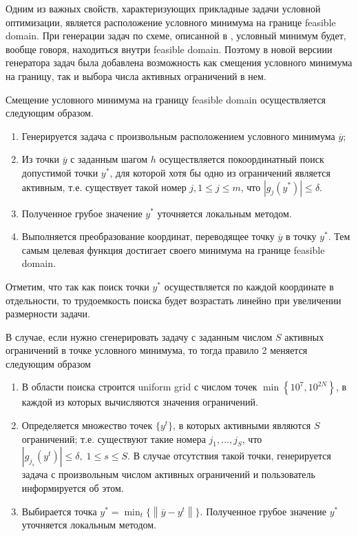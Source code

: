 \documentclass{aip-cp}
\begin{document}
\Russian
Одним из важных свойств, характеризующих прикладные задачи условной оптимизации, является расположение условного минимума на границе feasible domain. При генерации задач по схеме, описанной в \cite{Gergel2017}, условный минимум будет, вообще говоря, находиться внутри feasible domain. Поэтому в новой версиии генератора задач была добавлена возможность как смещения условного минимума на границу, так и выбора числа активных ограничений в нем.

Смещение условного минимума на границу feasible domain осуществляется следующим образом.
\begin{enumerate}
	\item Генерируется задача с произвольным расположением условного минимума $\overline{y}$;
	\item Из точки $\overline{y}$ с заданным шагом $h$ осуществляется покоординатный поиск допустимой точки $y^*$, для которой хотя бы одно из ограничений является активным, т.е. существует такой номер $j, 1 \leq j\leq m$, что $\left|g_j(y^*)\right| \leq \delta$. 
	\item Полученное грубое значение $y^*$ уточняется локальным методом. 
	\item Выполняется преобразование координат, переводящее точку $\overline{y}$ в точку $y^*$. Тем самым целевая функция достигает своего минимума на границе feasible domain. 
\end{enumerate}

Отметим, что так как поиск точки $y^*$ осуществляется по каждой координате в отдельности, то трудоемкость поиска будет возрастать линейно при увеличении размерности задачи.

В случае, если нужно сгенерировать задачу с заданным числом $S$ активных ограничений в точке условного минимума, то тогда правило 2 меняется следующим образом 
\begin{enumerate}
	\item В области поиска строится uniform grid с числом точек $\min \left\{10^7, 10^{2N} \right\}$, в каждой из которых вычисляются значения ограничений. 
	\item Определяется множество точек $\{y^t\}$, в которых активными являются $S$ ограничений; т.е. существуют такие номера $j_1, ...,j_S$, что $\left|g_{j_s}(y^t)\right|\leq \delta, \; 1\leq s \leq S$. В случае отсутствия такой точки, генерируется задача с произвольным числом активных ограничений и пользователь информируется об этом.
	\item Выбирается точка $y^* = \min_{t} \{\left\|\overline{y} - y^t\right\|\}$. Полученное грубое значение $y^*$ уточняется локальным методом. 
\end{enumerate}
\end{document}
